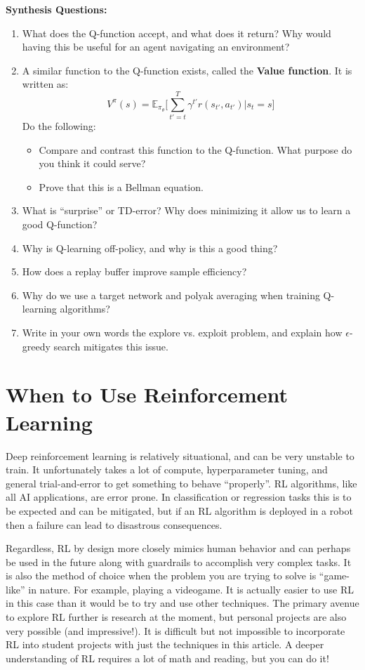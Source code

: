 \begin{questionbox}
\textbf{Synthesis Questions:}
\begin{enumerate}
    \item What does the Q-function accept, and what does it return? Why would having this be useful for an agent navigating an environment?
    \item A similar function to the Q-function exists, called the \textbf{Value function}. It is written as:
    $$V^\pi(s) = \mathbb{E}_{\pi_\theta} \biggl[ \sum_{t' = t}^T \gamma^{t'}r(s_{t'}, a_{t'}) | s_t = s\biggr]$$
    Do the following:
    \begin{itemize}
        \item Compare and contrast this function to the Q-function. What purpose do you think it could serve?
        \item Prove that this is a Bellman equation.
    \end{itemize}
    \item What is ``surprise'' or TD-error? Why does minimizing it allow us to learn a good Q-function?
    \item Why is Q-learning off-policy, and why is this a good thing?
    \item How does a replay buffer improve sample efficiency?
    \item Why do we use a target network and polyak averaging when training Q-learning algorithms?
    \item Write in your own words the explore vs. exploit problem, and explain how $\epsilon$-greedy search mitigates this issue.
\end{enumerate}
\end{questionbox}

\section{When to Use Reinforcement Learning}
\begin{flushleft}
    \large Deep reinforcement learning is relatively situational, and can be very unstable to train. It unfortunately takes a lot of compute, hyperparameter tuning, and general trial-and-error to get something to behave ``properly''. RL algorithms, like all AI applications, are error prone. In classification or regression tasks this is to be expected and can be mitigated, but if an RL algorithm is deployed in a robot then a failure can lead to disastrous consequences. \break
    
    Regardless, RL by design more closely mimics human behavior and can perhaps be used in the future along with guardrails to accomplish very complex tasks. It is also the method of choice when the problem you are trying to solve is ``game-like'' in nature. For example, playing a videogame. It is actually easier to use RL in this case than it would be to try and use other techniques. The primary avenue to explore RL further is research at the moment, but personal projects are also very possible (and impressive!). It is difficult but not impossible to incorporate RL into student projects with just the techniques in this article. A deeper understanding of RL requires a lot of math and reading, but you can do it!
\end{flushleft}

